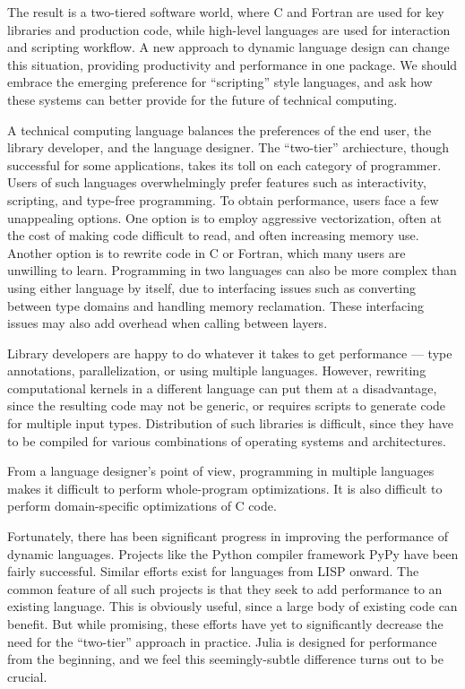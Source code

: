 \documentclass[9pt]{sigplanconf}
\begin{document}
The result is a two-tiered software world, where C and Fortran are
used for key libraries and production code, while high-level languages
are used for interaction and scripting workflow.  A new
approach to dynamic language design can change this situation,
providing productivity and performance in one
package. We should embrace the emerging preference for ``scripting''
style languages, and ask how these systems can better provide for the
future of technical computing.

A technical computing language balances the preferences of the end
user, the library developer, and the language designer.
The ``two-tier'' archiecture, though successful for some applications,
takes its toll on each category of programmer.
Users of such
languages overwhelmingly prefer features such as interactivity,
scripting, and type-free programming.
To obtain performance, users face a few unappealing options.
One option is to employ aggressive vectorization, often at the cost of making
code difficult to read, and often increasing memory use.
Another option is to rewrite code in C or Fortran, which many users
are unwilling to learn. Programming in two
languages can also be more complex than using either language by
itself, due to interfacing issues such as converting between type
domains and handling memory reclamation.  These interfacing issues may
also add overhead when calling between layers.

Library developers are happy to do whatever it takes to get
performance --- type annotations, parallelization, or using multiple
languages.
However, rewriting computational kernels in a different
language can put them at a disadvantage, since the resulting
code may not be generic, or requires scripts to
generate code for multiple input types. Distribution of
such libraries is difficult, since they have to be compiled for
various combinations of operating systems and architectures.

From a language designer's point of view, programming in multiple
languages makes it difficult to perform whole-program optimizations. It
is also difficult to perform domain-specific optimizations of C code.

Fortunately, there has been significant progress in improving the
performance of dynamic languages. Projects like the Python compiler
framework PyPy \cite{pypyjit} have been fairly successful. Similar
efforts exist for languages from LISP onward. The common feature of
all such projects is that they seek to add performance to an existing
language. This is obviously useful, since a large body of existing code
can benefit. But while
promising, these efforts have yet to significantly decrease the need for
the ``two-tier'' approach in practice.
Julia is designed for
performance from the beginning, and we feel this seemingly-subtle
difference turns out to be crucial.
\end{document}
